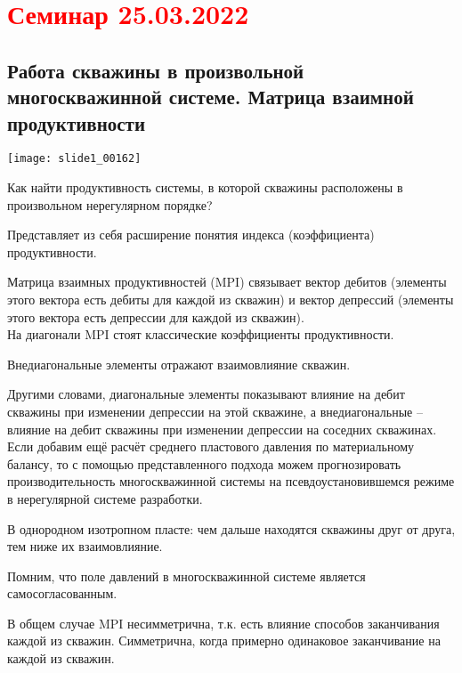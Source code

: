 \documentclass[main.tex]{subfiles}
\begin{document}
\section{\textcolor{red}{Семинар 25.03.2022}}

\subsection{Работа скважины в произвольной многоскважинной системе. Матрица взаимной продуктивности}

\texttt{[image: slide1\_00162]}

Как найти продуктивность системы, в которой скважины расположены в произвольном нерегулярном порядке?



Представляет из себя расширение понятия индекса (коэффициента) продуктивности.

Матрица взаимных продуктивностей (MPI) связывает вектор дебитов (элементы этого вектора есть дебиты для каждой из скважин) и вектор депрессий (элементы этого вектора есть депрессии для каждой из скважин).\\

На диагонали MPI стоят классические коэффициенты продуктивности.

Внедиагональные элементы отражают взаимовлияние скважин.

Другими словами, диагональные элементы показывают влияние на дебит скважины при изменении депрессии на этой скважине, а внедиагональные -- влияние на дебит скважины при изменении депрессии на соседних скважинах.\\

Если добавим ещё расчёт среднего пластового давления по материальному балансу, то с помощью представленного подхода можем прогнозировать производительность многоскважинной системы на псевдоустановившемся режиме в нерегулярной системе разработки.

В однородном изотропном пласте: чем дальше находятся скважины друг от друга, тем ниже их взаимовлияние.


Помним, что поле давлений в многоскважинной системе является самосогласованным.


В общем случае MPI несимметрична, т.к. есть влияние способов заканчивания каждой из скважин. Симметрична, когда примерно одинаковое заканчивание на каждой из скважин.
\end{document}
